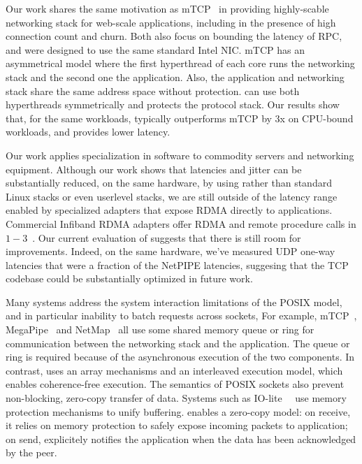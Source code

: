  Our work shares the same
motivation as mTCP~\cite{jeong2014mtcp} in providing highly-scable
networking stack for web-scale applications, including in the presence
of high connection count and churn.  Both also focus on bounding the
latency of RPC, and were designed to use the same standard Intel NIC.
mTCP has an asymmetrical model where the first hyperthread of each
core runs the networking stack and the second one the application.
Also, the application and networking stack share the same address
space without protection.  \ix can use both hyperthreads symmetrically
and protects the protocol stack.   Our results show
that, for the same workloads, \ix typically outperforms mTCP by 3x on
CPU-bound workloads, and provides lower latency.
 
 Our work applies
specialization in software to commodity servers and networking
equipment.  Although our work shows that latencies and jitter can be
substantially reduced, on the same hardware, by using \ix rather than
standard Linux stacks or even userlevel stacks, we are still outside
of the latency range enabled by specialized adapters that expose RDMA
directly to applications.  Commercial Infiband RDMA adapters offer
RDMA and remote procedure calls in
$1-3$\microsecond~\cite{DBLP:conf/sosp/OngaroRSOR11,Jose:2011:MDH,mitchell:rdma,dragojevic14farm}.
Our current evaluation of \ix suggests that there is still room for
improvements.  Indeed, on the same hardware, we've measured UDP
one-way latencies that were a fraction of the NetPIPE latencies,
suggesing that the TCP codebase could be substantially optimized in
future work.

Many systems address the system interaction limitations of the POSIX
model, and in particular inability to batch requests across sockets,
For example, mTCP~\cite{jeong2014mtcp},
MegaPipe~\cite{han2012megapipe} and NetMap~\cite{rizzo2012netmap} all
use some shared memory queue or ring for communication between the
networking stack and the application.  The queue or ring is required
because of the asynchronous execution of the two components.  In
contrast, \ix uses an array mechanisms and an interleaved execution
model, which enables coherence-free execution.  The semantics of POSIX
sockets also prevent non-blocking, zero-copy transfer of data. Systems
such as IO-lite~~\cite{DBLP:journals/tocs/PaiDZ00} use memory
protection mechanisms to unify buffering.  \ix enables a zero-copy
model: on receive, it relies on memory protection to safely expose
incoming packets to application; on send, \ix explicitely notifies the
application when the data has been acknowledged by the peer.



